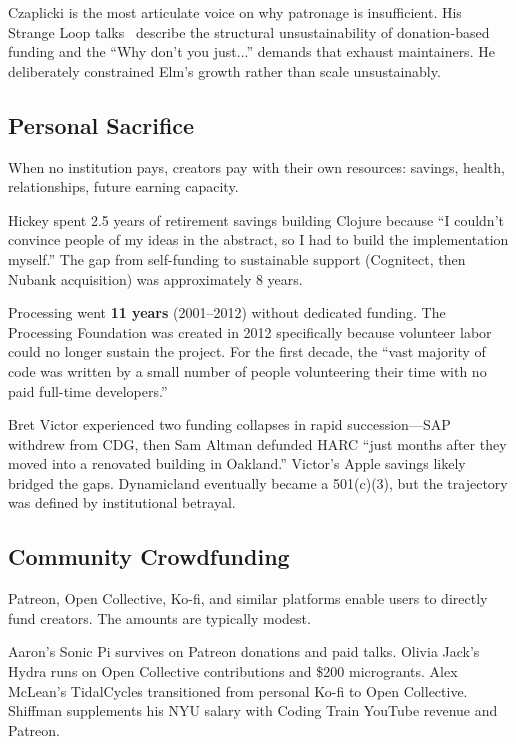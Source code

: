 \documentclass[10pt,letterpaper,twocolumn]{article}
\begin{document}
Czaplicki is the most articulate voice on why patronage is insufficient. His Strange Loop talks~\citep{czaplicki2018hard, czaplicki2023economics} describe the structural unsustainability of donation-based funding and the ``Why don't you just...'' demands that exhaust maintainers. He deliberately constrained Elm's growth rather than scale unsustainably.

\subsection{Personal Sacrifice}

When no institution pays, creators pay with their own resources: savings, health, relationships, future earning capacity.

Hickey spent 2.5 years of retirement savings building Clojure because ``I couldn't convince people of my ideas in the abstract, so I had to build the implementation myself.'' The gap from self-funding to sustainable support (Cognitect, then Nubank acquisition) was approximately 8 years.

Processing went \textbf{11 years} (2001--2012) without dedicated funding. The Processing Foundation was created in 2012 specifically because volunteer labor could no longer sustain the project. For the first decade, the ``vast majority of code was written by a small number of people volunteering their time with no paid full-time developers.''

Bret Victor experienced two funding collapses in rapid succession---SAP withdrew from CDG, then Sam Altman defunded HARC ``just months after they moved into a renovated building in Oakland.'' Victor's Apple savings likely bridged the gaps. Dynamicland eventually became a 501(c)(3), but the trajectory was defined by institutional betrayal.

\subsection{Community Crowdfunding}

Patreon, Open Collective, Ko-fi, and similar platforms enable users to directly fund creators. The amounts are typically modest.

Aaron's Sonic Pi survives on Patreon donations and paid talks. Olivia Jack's Hydra runs on Open Collective contributions and \$200 microgrants. Alex McLean's TidalCycles transitioned from personal Ko-fi to Open Collective. Shiffman supplements his NYU salary with Coding Train YouTube revenue and Patreon.
\end{document}
